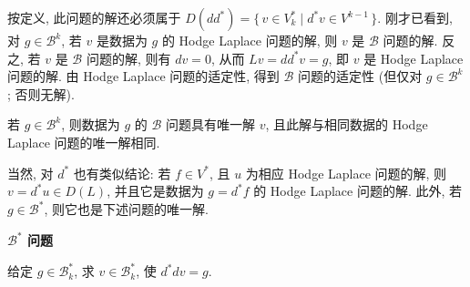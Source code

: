 {按定义, 此问题的解还必须属于 $D(dd^*)=\{\,v\in V_k^*\mid d^*v\in V^{k-1}\,\}$. 刚才已看到, 对 $g\in\mathcal B^k$, 若 $v$ 是数据为 $g$ 的 Hodge Laplace 问题的解, 则 $v$ 是 $\mathcal B$ 问题的解. 反之, 若 $v$ 是 $\mathcal B$ 问题的解, 则有 $dv=0$, 从而 $Lv=dd^*v=g$, 即 $v$ 是 Hodge Laplace 问题的解. 由 Hodge Laplace 问题的适定性, 得到 $\mathcal B$ 问题的适定性 (但仅对 $g\in\mathcal B^k$; 否则无解).}

\begin{Theorem}\label{thm:hodge-boundary-problem}
{若 $g\in\mathcal B^k$, 则数据为 $g$ 的 $\mathcal B$ 问题具有唯一解 $v$, 且此解与相同数据的 Hodge Laplace 问题的唯一解相同.}
\end{Theorem}

{当然, 对 $d^*$ 也有类似结论: 若 $f\in V^*$, 且 $u$ 为相应 Hodge Laplace 问题的解, 则 $v=d^*u\in D(L)$, 并且它是数据为 $g=d^*f$ 的 Hodge Laplace 问题的解. 此外, 若 $g\in\mathcal B^*$, 则它也是下述问题的唯一解.}

\medskip\noindent\textbf{{$\mathcal B^*$ 问题}}\par
{给定 $g\in\mathcal B_k^*$, 求 $v\in\mathcal B_k^*$, 使 $d^*dv=g$.}
